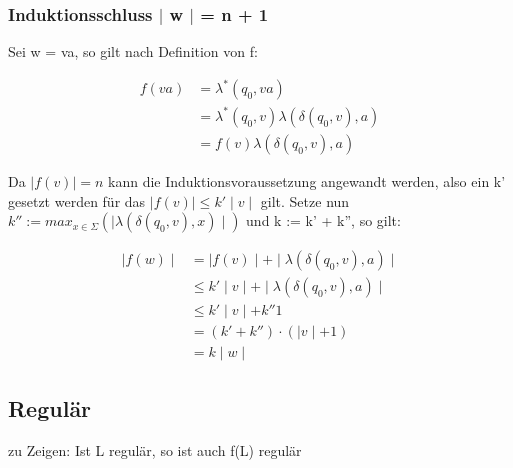 \documentclass[12pt, a4paper]{article}
\begin{document}
\subsubsection*{Induktionsschluss $\mid$ w $\mid$ = n + 1}

Sei w = va, so gilt nach Definition von f: 

\begin{align*}
f(va) &= \lambda^*(q_0, va) \\
&= \lambda^*(q_0, v) \lambda(\delta(q_0,v), a) \\
&= f(v)  \lambda(\delta(q_0,v), a) 
\end{align*} 

Da $\mid f(v) \mid = n$ kann die Induktionsvoraussetzung angewandt werden, also ein k' gesetzt werden für das $\mid f(v) \mid \le k' \mid v \mid$ gilt. Setze nun $k'' := max_{x \in \Sigma}(\mid \lambda(\delta(q_0,v),x) \mid )$ und k := k' + k'', so gilt:

\begin{align*}
\mid f(w) \mid &= \mid f(v) \mid + \mid \lambda(\delta(q_0,v),a) \mid \\
&\le k' \mid v \mid + \mid \lambda(\delta(q_0,v),a) \mid \\
&\le k' \mid v \mid + k'' 1 \\
&= (k' + k'') \cdot (\mid v \mid + 1) \\
&= k \mid w \mid
\end{align*}

\subsection*{Regulär}
zu Zeigen: Ist L regulär, so ist auch f(L) regulär
\end{document}
